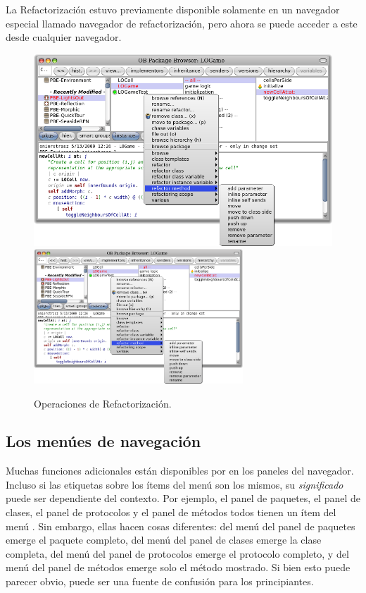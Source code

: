 \documentclass[spanish,a4paper,10pt,twoside]{book}
\begin{document}
La Refactorizaci\'on estuvo previamente disponible solamente en un navegador especial llamado navegador de refactorizaci\'on, pero ahora se puede acceder a este desde cualquier navegador.

\begin{figure}[btp]
	\begin{center}
	\ifluluelse
		{\includegraphics[width=\textwidth]{refactoring}}
		{\includegraphics[width=0.7\textwidth]{refactoring}}
	\end{center}
	\caption{Operaciones de Refactorizaci\'on.}
\end{figure}

\subsection{Los men\'ues de navegaci\'on}

Muchas funciones adicionales est\'an disponibles por  en los paneles del navegador.
Incluso si las etiquetas sobre los \'items del men\'u son los mismos, su \emph{significado} puede ser dependiente del contexto.
Por ejemplo, el panel de paquetes, el panel de clases, el panel de protocolos y el panel de m\'etodos todos tienen un \'item del men\'u .  Sin embargo, ellas hacen cosas diferentes: del men\'u del panel de paquetes  emerge el paquete completo, del men\'u del panel de clases  emerge la clase completa, del men\'u del panel de protocolos  emerge el protocolo completo, y del men\'u del panel de m\'etodos  emerge solo el m\'etodo mostrado.
Si bien esto puede parecer obvio, puede ser una fuente de confusi\'on para los principiantes.
\end{document}

